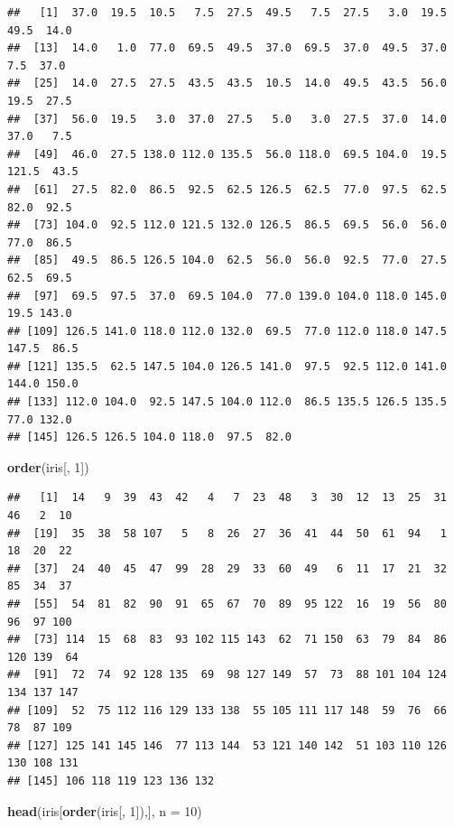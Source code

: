 \documentclass[
]{book}
\newenvironment{Shaded}{\begin{snugshade}}{\end{snugshade}}
\newcommand{\DataTypeTok}[1]{\textcolor[rgb]{0.13,0.29,0.53}{#1}}
\newcommand{\DecValTok}[1]{\textcolor[rgb]{0.00,0.00,0.81}{#1}}
\newcommand{\KeywordTok}[1]{\textcolor[rgb]{0.13,0.29,0.53}{\textbf{#1}}}
\newcommand{\NormalTok}[1]{#1}
\begin{document}
\begin{verbatim}
##   [1]  37.0  19.5  10.5   7.5  27.5  49.5   7.5  27.5   3.0  19.5  49.5  14.0
##  [13]  14.0   1.0  77.0  69.5  49.5  37.0  69.5  37.0  49.5  37.0   7.5  37.0
##  [25]  14.0  27.5  27.5  43.5  43.5  10.5  14.0  49.5  43.5  56.0  19.5  27.5
##  [37]  56.0  19.5   3.0  37.0  27.5   5.0   3.0  27.5  37.0  14.0  37.0   7.5
##  [49]  46.0  27.5 138.0 112.0 135.5  56.0 118.0  69.5 104.0  19.5 121.5  43.5
##  [61]  27.5  82.0  86.5  92.5  62.5 126.5  62.5  77.0  97.5  62.5  82.0  92.5
##  [73] 104.0  92.5 112.0 121.5 132.0 126.5  86.5  69.5  56.0  56.0  77.0  86.5
##  [85]  49.5  86.5 126.5 104.0  62.5  56.0  56.0  92.5  77.0  27.5  62.5  69.5
##  [97]  69.5  97.5  37.0  69.5 104.0  77.0 139.0 104.0 118.0 145.0  19.5 143.0
## [109] 126.5 141.0 118.0 112.0 132.0  69.5  77.0 112.0 118.0 147.5 147.5  86.5
## [121] 135.5  62.5 147.5 104.0 126.5 141.0  97.5  92.5 112.0 141.0 144.0 150.0
## [133] 112.0 104.0  92.5 147.5 104.0 112.0  86.5 135.5 126.5 135.5  77.0 132.0
## [145] 126.5 126.5 104.0 118.0  97.5  82.0
\end{verbatim}

\begin{Shaded}
\begin{Highlighting}[]
\KeywordTok{order}\NormalTok{(iris[, }\DecValTok{1}\NormalTok{])}
\end{Highlighting}
\end{Shaded}

\begin{verbatim}
##   [1]  14   9  39  43  42   4   7  23  48   3  30  12  13  25  31  46   2  10
##  [19]  35  38  58 107   5   8  26  27  36  41  44  50  61  94   1  18  20  22
##  [37]  24  40  45  47  99  28  29  33  60  49   6  11  17  21  32  85  34  37
##  [55]  54  81  82  90  91  65  67  70  89  95 122  16  19  56  80  96  97 100
##  [73] 114  15  68  83  93 102 115 143  62  71 150  63  79  84  86 120 139  64
##  [91]  72  74  92 128 135  69  98 127 149  57  73  88 101 104 124 134 137 147
## [109]  52  75 112 116 129 133 138  55 105 111 117 148  59  76  66  78  87 109
## [127] 125 141 145 146  77 113 144  53 121 140 142  51 103 110 126 130 108 131
## [145] 106 118 119 123 136 132
\end{verbatim}

\begin{Shaded}
\begin{Highlighting}[]
\KeywordTok{head}\NormalTok{(iris[}\KeywordTok{order}\NormalTok{(iris[, }\DecValTok{1}\NormalTok{]),], }\DataTypeTok{n =} \DecValTok{10}\NormalTok{)}
\end{Highlighting}
\end{Shaded}
\end{document}
